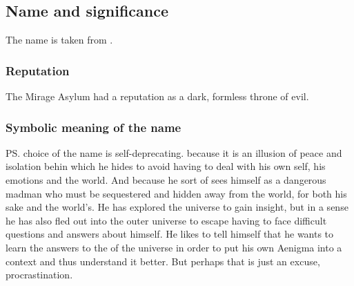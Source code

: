 \subsection{Name and significance}
The name is taken from . 





\subsubsection{Reputation}
The Mirage Asylum had a reputation as a dark, formless throne of evil. 






\subsubsection{Symbolic meaning of the name}
\ps{\Ishnaruchaefir} choice of the name  is self-deprecating. 
 because it is an illusion of peace and isolation behin which he hides to avoid having to deal with his own self, his emotions and the world. 
And  because he sort of sees himself as a dangerous madman who must be sequestered and hidden away from the world, for both his sake and the world's. 
He has explored the universe to gain insight, but in a sense he has also fled out into the outer universe to escape having to face difficult questions and answers about himself. 
He likes to tell himself that he wants to learn the answers to the  of the universe in order to put his own Aenigma into a context and thus understand it better. 
But perhaps that is just an excuse, procrastination. 









